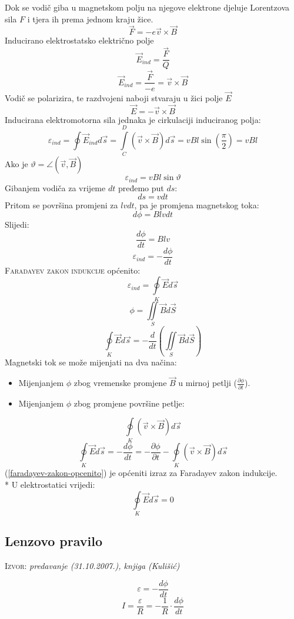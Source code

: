 \documentclass{report}
\begin{document}
Dok se vodič giba u magnetskom polju na njegove elektrone djeluje Lorentzova sila $F$ i tjera ih prema jednom kraju žice.
$$\vec{F} = -e \vec{v} \times \vec{B}$$
Inducirano elektrostatsko električno polje
$$\vec E _{ind} = \frac{\vec{F}}{Q}$$
$$\vec E _{ind} = \frac{\vec{F}}{-e} = \vec{v} \times \vec{B}$$
Vodič se polarizira, te razdvojeni naboji stvaraju u žici polje $\vec{E}$
$$\vec{E} = - \vec{v} \times \vec{B}$$
Inducirana elektromotorna sila jednaka je cirkulaciji induciranog polja:
$$\varepsilon _{ind} = \oint{\vec{E} _{ind}d \vec{s}} = \int \limits_C^D {(\vec{v} \times \vec{B} )d \vec{s}} = vBl \sin \left (\frac{\pi}{2} \right ) = vBl$$
Ako je $\vartheta = \angle (\vec{v}, \vec{B})$
$$\varepsilon _{ind} = vBl \sin \vartheta $$
Gibanjem vodiča za vrijeme $dt$ pređemo put $ds$:
$$ds = vdt$$
Pritom se površina promjeni za $lvdt$, pa je promjena magnetskog toka:
$$d \phi = B l v dt$$
Slijedi:
$$\frac{d \phi}{dt} = Blv$$
$$\varepsilon _{ind} = - \frac{d \phi}{dt}$$
\textsc{Faradayev zakon indukcije} općenito:
$$\varepsilon _{ind} = \oint\limits_K {\vec Ed\vec s} $$
$$\phi = \iint\limits_S {\vec Bd\vec S}$$
$$\oint\limits_K {\vec Ed\vec s} = - \frac{d}{dt} \left ( \iint\limits_S {\vec Bd\vec S}  \right )$$
Magnetski tok se može mijenjati na dva načina:
\begin{itemize}
 \item Mijenjanjem $\phi $ zbog vremenske promjene $\vec{B}$ u mirnoj petlji ($\frac{\partial \phi}{\partial t}$).
 \item Mijenjanjem $\phi $ zbog promjene površine petlje:
\end{itemize}
$$\oint\limits_K {\left( {\vec v \times \vec B} \right)d\vec s} $$
\begin{equation}
	\oint\limits_K {\vec E d\vec s} = - \frac{d \phi}{dt} = - \frac{\partial  \phi}{\partial t} - \oint\limits_K {\left( {\vec v \times \vec B} \right)d\vec s}
	\label{faradayev-zakon-opcenito}
\end{equation}
(\ref{faradayev-zakon-opcenito}) je općeniti izraz za Faradayev zakon indukcije.\\*
U elektrostatici vrijedi:
$$\oint\limits_K {\vec E d\vec s} = 0$$

\subsection{Lenzovo pravilo}
\small \textsc{Izvor:} \textit{predavanje (31.10.2007.), knjiga (Kulišić)}

$$\varepsilon = - \frac{d \phi}{dt}$$
$$I = \frac{\varepsilon}{R} = - \frac{1}{R} \cdot \frac{d \phi}{dt}$$
\end{document}
